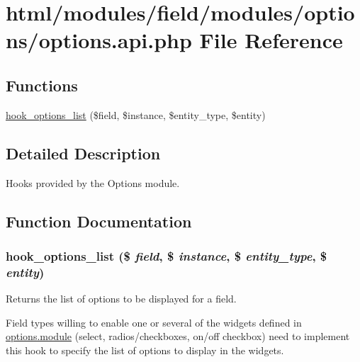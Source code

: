 \hypertarget{options_8api_8php}{
\section{html/modules/field/modules/options/options.api.php File Reference}
\label{options_8api_8php}
}
\subsection*{Functions}
\begin{DoxyCompactItemize}
\item 
\hyperlink{options_8api_8php_aa25d7440810f3dc0c137ef0e5747b485}{hook\_\-options\_\-list} (\$field, \$instance, \$entity\_\-type, \$entity)
\end{DoxyCompactItemize}


\subsection{Detailed Description}
Hooks provided by the Options module. 

\subsection{Function Documentation}
\hypertarget{options_8api_8php_aa25d7440810f3dc0c137ef0e5747b485}{
\subsubsection[{hook\_\-options\_\-list}]{\setlength{\rightskip}{0pt plus 5cm}hook\_\-options\_\-list (\$ {\em field}, \/  \$ {\em instance}, \/  \$ {\em entity\_\-type}, \/  \$ {\em entity})}}
\label{options_8api_8php_aa25d7440810f3dc0c137ef0e5747b485}
Returns the list of options to be displayed for a field.

Field types willing to enable one or several of the widgets defined in \hyperlink{options_8module}{options.module} (select, radios/checkboxes, on/off checkbox) need to implement this hook to specify the list of options to display in the widgets.


